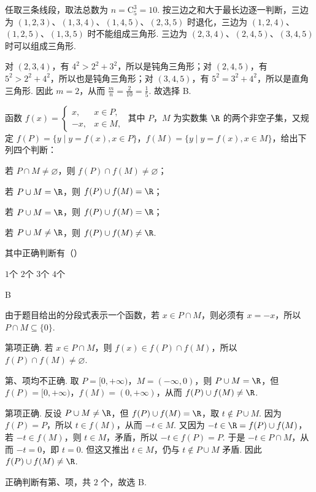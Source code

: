 \begin{solution}
任取三条线段，取法总数为
\(n=\mathrm C_5^3=10\).
按三边之和大于最长边逐一判断，三边为 \((1,2,3)\)、\((1,3,4)\)、\((1,4,5)\)、\((2,3,5)\) 时退化，三边为 \((1,2,4)\)、\((1,2,5)\)、\((1,3,5)\) 时不能组成三角形. 三边为 \((2,3,4)\)、\((2,4,5)\)、\((3,4,5)\) 时可以组成三角形.

对 \((2,3,4)\)，有 \(4^2>2^2+3^2\)，所以是钝角三角形；对 \((2,4,5)\)，有 \(5^2>2^2+4^2\)，所以也是钝角三角形；对 \((3,4,5)\)，有 \(5^2=3^2+4^2\)，所以是直角三角形. 因此 \(m=2\)，从而 \(\frac{m}{n}=\frac{2}{10}=\frac15\).
故选择 B.
\end{solution}

\begin{problem}
函数 \(f(x)=\begin{cases}
x, & x\in P,\\
-x, & x\in M,
\end{cases}\) 其中 \(P\)，\(M\) 为实数集 \(\R\) 的两个非空子集，又规定 \(f(P)=\{y\mid y=f(x),x\in P\}\)，\(f(M)=\{y\mid y=f(x),x\in M\}\)，给出下列四个判断：

\begin{circlelist}
\item 若 \(P\cap M\neq\varnothing\)，则 \(f(P)\cap f(M)\neq\varnothing\)；
\item 若 \(P\cup M=\R\)，则 \(f(P)\cup f(M)=\R\)；
\item 若 \(P\cup M=\R\)，则 \(f(P)\cup f(M)=\R\)；
\item 若 \(P\cup M\neq\R\)，则 \(f(P)\cup f(M)\neq\R\).
\end{circlelist}

其中正确判断有（\quad）

\choices
    {\(1\)个}
    {\(2\)个}
    {\(3\)个}
    {\(4\)个}
\end{problem}

\begin{answer}
B
\end{answer}

\begin{solution}
由于题目给出的分段式表示一个函数，若 \(x\in P\cap M\)，则必须有 \(x=-x\)，所以 \(P\cap M\subseteq\{0\}\).

第项正确. 若 \(x\in P\cap M\)，则 \(f(x)\in f(P)\cap f(M)\)，所以 \(f(P)\cap f(M)\neq\varnothing\).

第、项均不正确. 取 \(P=[0,+\infty)\)，\(M=(-\infty,0)\)，则 \(P\cup M=\R\)，但 \(f(P)=[0,+\infty)\)，\(f(M)=(0,+\infty)\)，从而 \(f(P)\cup f(M)\neq\R\).

第项正确. 反设 \(P\cup M\neq\R\)，但 \(f(P)\cup f(M)=\R\)，取 \(t\notin P\cup M\). 因为 \(f(P)=P\)，所以 \(t\in f(M)\)，从而 \(-t\in M\). 又因为 \(-t\in\R=f(P)\cup f(M)\)，若 \(-t\in f(M)\)，则 \(t\in M\)，矛盾，所以 \(-t\in f(P)=P\). 于是 \(-t\in P\cap M\)，从而 \(-t=0\)，即 \(t=0\). 但这又推出 \(t\in M\)，仍与 \(t\notin P\cup M\) 矛盾. 因此 \(f(P)\cup f(M)\neq\R\).

正确判断有第、项，共 \(2\) 个，故选 B.
\end{solution}

